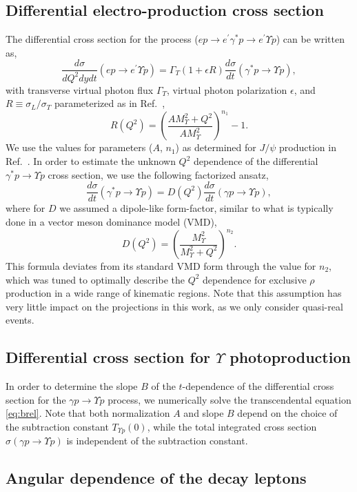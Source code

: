 \documentclass[prd,amsmath,%
twocolumn,floatfix,amssymb, preprintnumbers, nofootinbib, superscriptaddress]{revtex4}
\newcommand{\beq}{\begin{equation}}
\newcommand{\eeq}{\end{equation}}
\begin{document}
\subsection{Differential electro-production cross section}

The differential cross section for the process ($e p \to e^\prime \gamma^* p \to e^\prime \Upsilon p$) can be written as,
\beq
\frac{d\sigma}{dQ^2dydt}(e p \to e^\prime \Upsilon p) = 
\Gamma_T(1+\epsilon R)
\frac{d\sigma}{dt}(\gamma^* p \to \Upsilon p),
\eeq
with transverse virtual photon flux $\Gamma_T$, virtual photon polarization $\epsilon$, and 
$R\equiv\sigma_L/\sigma_T$ parameterized as in Ref.~\cite{Martynov:2002ez},
\beq
R(Q^2) = \left(\frac{A M_\Upsilon^2 + Q^2}{A M_\Upsilon^2}\right)^{n_1} - 1.
\eeq
We use the values for parameters ($A$, $n_1$) as determined for $J/\psi$ production in Ref.~\cite{Fiore:2009xk}.
In order to estimate the unknown $Q^2$ dependence of the differential $\gamma^* p \to \Upsilon p$ cross section, we use the following factorized ansatz,
\beq
\frac{d\sigma}{dt}(\gamma^* p \to \Upsilon p) = D(Q^2) \frac{d\sigma}{dt}(\gamma p \to \Upsilon p),
\eeq
where for $D$ we assumed a dipole-like form-factor, similar to what is typically
done in a vector meson dominance model (VMD),
\beq
D(Q^2) = \left(\frac{M_\Upsilon^2}{M_\Upsilon^2 + Q^2}\right)^{n_2}.
\eeq
This formula deviates from its standard VMD form through the value for $n_2$, which was
tuned to optimally describe the $Q^2$ dependence for exclusive $\rho$ production in a wide range
of kinematic regions.
Note that this assumption has very little impact on the projections in this work, as we only consider quasi-real events.

\subsection{Differential cross section for $\Upsilon$ photoproduction}

In order to determine the slope $B$ of the $t$-dependence of the differential cross section for 
the $\gamma p \to \Upsilon p$ process, we numerically solve the transcendental equation \eqref{eq:brel}.
Note that both  normalization $A$ and slope $B$ depend on the choice of the subtraction
constant $T_{\Upsilon p} (0)$, while the total integrated cross section 
$\sigma(\gamma p \to \Upsilon p)$ is independent of the subtraction constant.

\subsection{Angular dependence of the decay leptons}
\end{document}
